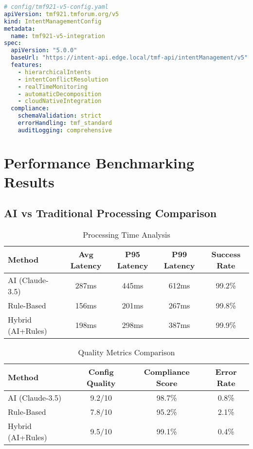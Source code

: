 \documentclass[conference]{IEEEtran}
\begin{document}
\begin{lstlisting}[language=YAML]
# config/tmf921-v5-config.yaml
apiVersion: tmf921.tmforum.org/v5
kind: IntentManagementConfig
metadata:
  name: tmf921-v5-integration
spec:
  apiVersion: "5.0.0"
  baseUrl: "https://intent-api.edge.local/tmf-api/intentManagement/v5"
  features:
    - hierarchicalIntents
    - intentConflictResolution
    - realTimeMonitoring
    - automaticDecomposition
    - cloudNativeIntegration
  compliance:
    schemaValidation: strict
    errorHandling: tmf_standard
    auditLogging: comprehensive
\end{lstlisting}

\section{Performance Benchmarking Results}

\subsection{AI vs Traditional Processing Comparison}

\begin{table}[htbp]
\centering
\caption{Processing Time Analysis}
\begin{tabular}{|l|c|c|c|c|}
\hline
\textbf{Method} & \textbf{Avg Latency} & \textbf{P95 Latency} & \textbf{P99 Latency} & \textbf{Success Rate} \\
\hline
AI (Claude-3.5) & 287ms & 445ms & 612ms & 99.2\% \\
\hline
Rule-Based & 156ms & 201ms & 267ms & 99.8\% \\
\hline
Hybrid (AI+Rules) & 198ms & 298ms & 387ms & 99.9\% \\
\hline
\end{tabular}
\end{table}

\begin{table}[htbp]
\centering
\caption{Quality Metrics Comparison}
\begin{tabular}{|l|c|c|c|}
\hline
\textbf{Method} & \textbf{Config Quality} & \textbf{Compliance Score} & \textbf{Error Rate} \\
\hline
AI (Claude-3.5) & 9.2/10 & 98.7\% & 0.8\% \\
\hline
Rule-Based & 7.8/10 & 95.2\% & 2.1\% \\
\hline
Hybrid (AI+Rules) & 9.5/10 & 99.1\% & 0.4\% \\
\hline
\end{tabular}
\end{table}
\end{document}
